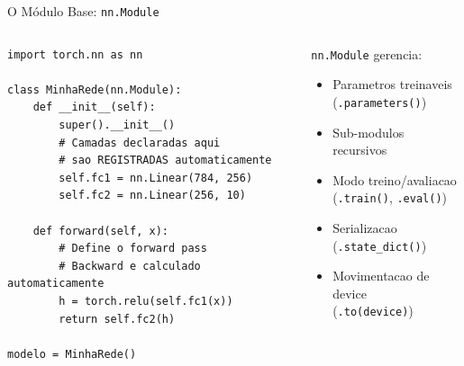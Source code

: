 \documentclass[aspectratio=169, 10pt]{beamer}
\begin{document}
\begin{frame}[fragile]{O Módulo Base: \texttt{nn.Module}}
\begin{columns}
\begin{lstlisting}
import torch.nn as nn

class MinhaRede(nn.Module):
    def __init__(self):
        super().__init__()
        # Camadas declaradas aqui
        # sao REGISTRADAS automaticamente
        self.fc1 = nn.Linear(784, 256)
        self.fc2 = nn.Linear(256, 10)

    def forward(self, x):
        # Define o forward pass
        # Backward e calculado automaticamente
        h = torch.relu(self.fc1(x))
        return self.fc2(h)

modelo = MinhaRede()
\end{lstlisting}

\begin{block}{\texttt{nn.Module} gerencia:}
  \begin{itemize}
    \item Parametros treinaveis\\(\texttt{.parameters()})
    \item Sub-modulos recursivos
    \item Modo treino/avaliacao\\(\texttt{.train()}, \texttt{.eval()})
    \item Serializacao\\(\texttt{.state\_dict()})
    \item Movimentacao de device\\(\texttt{.to(device)})
  \end{itemize}
\end{block}
\end{columns}
\end{frame}

\end{document}
